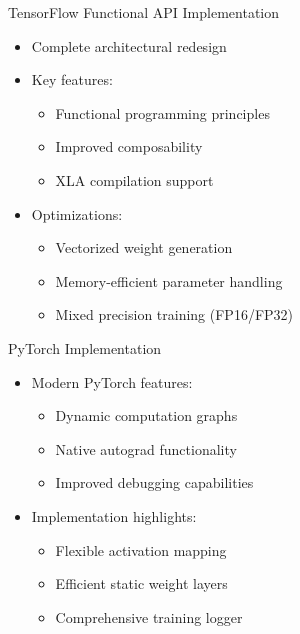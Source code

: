 \documentclass{beamer}
\begin{document}
\begin{frame}{TensorFlow Functional API Implementation}
    \begin{itemize}
        \item Complete architectural redesign
        \item Key features:
        \begin{itemize}
            \item Functional programming principles
            \item Improved composability
            \item XLA compilation support
        \end{itemize}
        \item Optimizations:
        \begin{itemize}
            \item Vectorized weight generation
            \item Memory-efficient parameter handling
            \item Mixed precision training (FP16/FP32)
        \end{itemize}
    \end{itemize}
\end{frame}

\begin{frame}{PyTorch Implementation}
    \begin{itemize}
        \item Modern PyTorch features:
        \begin{itemize}
            \item Dynamic computation graphs
            \item Native autograd functionality
            \item Improved debugging capabilities
        \end{itemize}
        \item Implementation highlights:
        \begin{itemize}
            \item Flexible activation mapping
            \item Efficient static weight layers
            \item Comprehensive training logger
        \end{itemize}
    \end{itemize}
\end{frame}
\end{document}
